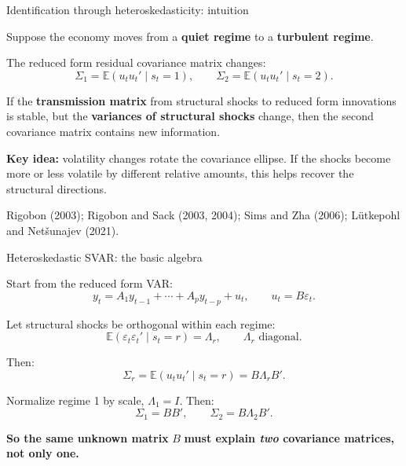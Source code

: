 \documentclass{beamer}
\begin{document}
\begin{frame}{Identification through heteroskedasticity: intuition}
\small

Suppose the economy moves from a \textbf{quiet regime} to a \textbf{turbulent regime}.

\medskip

The reduced form residual covariance matrix changes:
\[
\Sigma_1 = \mathbb E(u_tu_t'\mid s_t=1),
\qquad
\Sigma_2 = \mathbb E(u_tu_t'\mid s_t=2).
\]

\medskip

If the \textbf{transmission matrix} from structural shocks to reduced form innovations is stable, but the \textbf{variances of structural shocks} change, then the second covariance matrix contains new information.

\medskip

\textbf{Key idea:} volatility changes rotate the covariance ellipse. If the shocks become more or less volatile by different relative amounts, this helps recover the structural directions.

\medskip

\footnotesize Rigobon (2003); Rigobon and Sack (2003, 2004); Sims and Zha (2006); Lütkepohl and Netšunajev (2021).

\end{frame}


\begin{frame}{Heteroskedastic SVAR: the basic algebra}
\small

Start from the reduced form VAR:
\[
y_t = A_1y_{t-1}+\cdots+A_py_{t-p}+u_t,
\qquad
u_t = B\varepsilon_t.
\]

\medskip

Let structural shocks be orthogonal within each regime:
\[
\mathbb E(\varepsilon_t\varepsilon_t'\mid s_t=r)=\Lambda_r,
\qquad
\Lambda_r \text{ diagonal}.
\]

\medskip

Then:
\[
\Sigma_r = \mathbb E(u_tu_t'\mid s_t=r)=B\Lambda_r B'.
\]

\medskip

Normalize regime 1 by scale, $\Lambda_1=I$. Then:
\[
\Sigma_1=BB',
\qquad
\Sigma_2=B\Lambda_2B'.
\]

\medskip

\textbf{So the same unknown matrix} $B$ \textbf{must explain \textit{two} covariance matrices, not only one.}

\end{frame}
\end{document}
